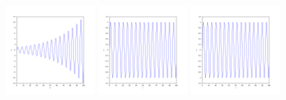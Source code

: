 \begin{figure}[H]
\centering
\includegraphics[width=0.3\textwidth]{images/soal_01_ode_euler_t_y1.pdf}
\includegraphics[width=0.3\textwidth]{images/soal_01_ode_euler_PC_t_y1.pdf}
\includegraphics[width=0.3\textwidth]{images/soal_01_ode_RK4_t_y1.pdf}
\par
\end{figure}